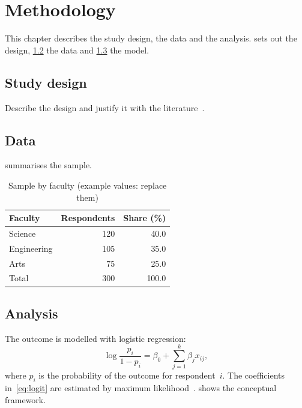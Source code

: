 
\chapter{Methodology}
\label{ch:methodology}

This chapter describes the study design, the data and the analysis.
 sets out the design, \cref{sec:data} the data and
\cref{sec:analysis} the model.

\section{Study design}
\label{sec:design}

Describe the design and justify it with the literature~\cite{surname2023keyword}.

\section{Data}
\label{sec:data}

 summarises the sample.

\begin{table}[htbp]
  \centering
  \caption{Sample by faculty (example values: replace them)}
  \label{tab:sample}
  \begin{tabular}{@{}lrr@{}}
    \toprule
    Faculty     & Respondents & Share (\%) \\
    \midrule
    Science     & 120         & 40.0 \\
    Engineering & 105         & 35.0 \\
    Arts        & 75          & 25.0 \\
    \midrule
    Total       & 300         & 100.0 \\
    \bottomrule
  \end{tabular}
\end{table}

\section{Analysis}
\label{sec:analysis}

The outcome is modelled with logistic regression:
\begin{equation}
  \log \frac{p_i}{1 - p_i} = \beta_0 + \sum_{j=1}^{k} \beta_j x_{ij},
  \label{eq:logit}
\end{equation}
where $p_i$ is the probability of the outcome for respondent~$i$.
The coefficients in~\eqref{eq:logit} are estimated by maximum likelihood~\cite{author2020book}.
 shows the conceptual framework.

